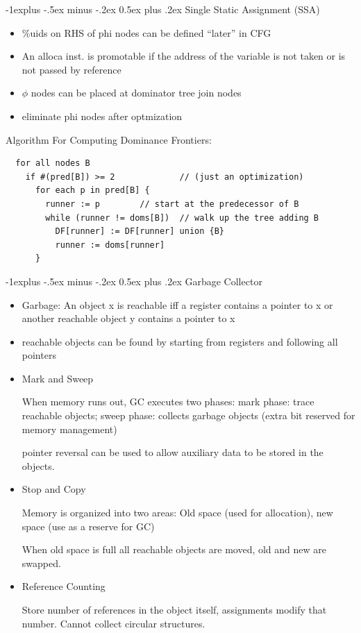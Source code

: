 \documentclass[10pt,landscape]{article}
\makeatletter
\renewcommand{\subsection}{\@startsection{subsection}{2}{0mm}%
                                {-1explus -.5ex minus -.2ex}%
                                {0.5ex plus .2ex}%
                                {\normalfont\normalsize\bfseries}}
\makeatother
\begin{document}
\begin{multicols}{3}
\subsection{Single Static Assignment (SSA)}
\begin{itemize}
  \item \%uids on RHS of phi nodes can be defined “later” in CFG
  \item An alloca inst. is promotable if the address of the variable is not taken or is not passed by reference
  \item $\phi$ nodes can be placed at dominator tree join nodes
	\item eliminate phi nodes after optmization
\end{itemize}
Algorithm For Computing Dominance Frontiers:
\begin{verbatim}
  for all nodes B
    if #(pred[B]) >= 2             // (just an optimization)
      for each p in pred[B] {
        runner := p        // start at the predecessor of B
        while (runner != doms[B])  // walk up the tree adding B
          DF[runner] := DF[runner] union {B}
          runner := doms[runner]
      }
\end{verbatim}
\subsection{Garbage Collector}
\begin{itemize}
	\item Garbage: An object x is reachable iff a register contains a pointer to x or another reachable object y contains a pointer to x
	\item reachable objects can be found by starting from registers and following all pointers
  \item Mark and Sweep
	
	When memory runs out, GC executes two phases: mark phase: trace reachable objects; sweep phase: collects garbage objects (extra bit reserved for memory management)
	
	pointer reversal can be used to allow auxiliary data to be stored in the objects.
	\item Stop and Copy
	
	Memory is organized into two areas: Old space (used for allocation), new space (use as a reserve for GC)
	
	When old space is full all reachable objects are moved, old and new are swapped.
	\item Reference Counting
	
	Store number of references in the object itself, assignments modify that number. Cannot collect circular structures.
	
\end{itemize}
\newpage
\end{multicols}
\end{document}
